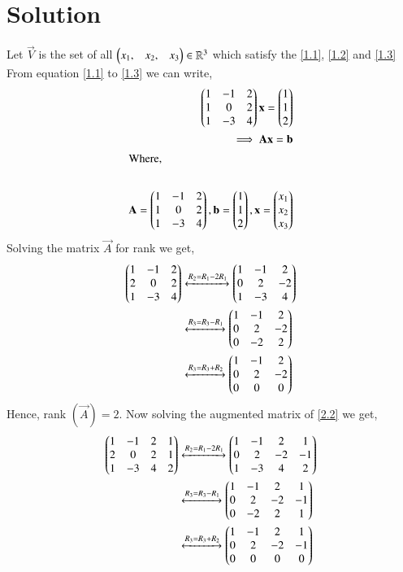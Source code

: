 \documentclass[journal,12pt,twocolumn]{IEEEtran}
\begin{document}
\section{Solution}
Let $\vec{V}$ is the set of all  $\begin{pmatrix}x_1, & x_2, & x_3 \end{pmatrix}\in \mathbb{R}^{3} $ which satisfy the \eqref{1.1}, \eqref{1.2} and \eqref{1.3}\\
From equation \eqref{1.1} to \eqref{1.3} we can write,
\begin{align}
\begin{pmatrix}1 & -1 & 2 \\ 1 & 0 & 2 \\ 1 & -3 & 4\end{pmatrix}\mathbf{x}= \begin{pmatrix}1 \\ 1 \\ 2\end{pmatrix}\\
\implies \mathbf{A}\mathbf{x} = \mathbf{b}  \label{2.2}\\
\intertext{Where,}\\
\mathbf{A} = \begin{pmatrix}1 & -1 & 2 \\ 1 & 0 & 2 \\ 1 & -3 & 4\end{pmatrix}, \mathbf{b}= \begin{pmatrix}1 \\ 1 \\ 2\end{pmatrix}, \mathbf{x} = \begin{pmatrix}x_1 \\ x_2 \\ x_3\end{pmatrix} \label{2.4}
\end{align}
Solving the  matrix $\vec{A}$ for rank  we get,
\begin{align}
\begin{pmatrix}1&-1& 2\\ 2& 0 & 2 \\ 1 & -3 & 4\end{pmatrix} &\xleftrightarrow{R_2=R_1 - 2R_1}\begin{pmatrix}1&-1&2 \\ 0 &2 & -2 \\ 1 &-3 & 4\end{pmatrix}\\
&\xleftrightarrow{R_3=R_3 -R_1}\begin{pmatrix}1 &-1&2 \\0 &2 &-2 \\ 0 & -2 & 2\end{pmatrix}\\
&\xleftrightarrow{R_3=R_3 + R_2}\begin{pmatrix}1 &-1&2 \\0 &2 &-2 \\ 0 & 0 & 0\end{pmatrix}
\end{align}
Hence, rank $\left(  \vec{A}  \right) = 2. $
Now solving the augmented matrix of \eqref{2.2} we get,
\begin{align}
\begin{pmatrix}1&-1& 2 & 1 \\ 2& 0 & 2 & 1 \\ 1 & -3 & 4 & 2 \end{pmatrix} &\xleftrightarrow{R_2=R_1 - 2R_1}\begin{pmatrix}1&-1&2 & 1  \\ 0 &2 & -2 & -1 \\ 1 &-3 & 4 & 2\end{pmatrix}\\
&\xleftrightarrow{R_3=R_3 -R_1}\begin{pmatrix}1 &-1&2 & 1\\0 &2 &-2 &-1 \\ 0 & -2 & 2 & 1\end{pmatrix} \\
&\xleftrightarrow{R_3=R_3 + R_2}\begin{pmatrix}1 &-1&2 & 1 \\0 &2 &-2 & -1 \\ 0 & 0 & 0 & 0\end{pmatrix}
\end{align}
\end{document}
